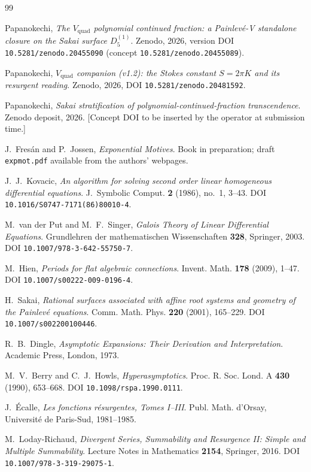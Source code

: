 \documentclass[11pt,reqno]{amsart}
\theoremstyle{plain}
\theoremstyle{definition}
\begin{document}
\begin{thebibliography}{99}

Papanokechi,
\emph{The $V_{\mathrm{quad}}$ polynomial continued fraction: a Painlev\'e-V standalone closure on
the Sakai surface $D_5^{(1)}$}.
Zenodo, 2026, version DOI \texttt{10.5281/zenodo.20455090} (concept
\texttt{10.5281/zenodo.20455089}).

Papanokechi,
\emph{$V_{\mathrm{quad}}$ companion (v1.2): the Stokes constant $S=2\pi K$ and its resurgent
reading}.
Zenodo, 2026, DOI \texttt{10.5281/zenodo.20481592}.

Papanokechi,
\emph{Sakai stratification of polynomial-continued-fraction transcendence}.
Zenodo deposit, 2026. [Concept DOI to be inserted by the operator at submission time.]

J.~Fres\'an and P.~Jossen,
\emph{Exponential Motives}.
Book in preparation; draft \texttt{expmot.pdf} available from the authors' webpages.

J.~J.~Kovacic,
\emph{An algorithm for solving second order linear homogeneous differential equations}.
J.~Symbolic Comput. \textbf{2} (1986), no.~1, 3--43.
DOI \texttt{10.1016/S0747-7171(86)80010-4}.

M.~van der Put and M.~F.~Singer,
\emph{Galois Theory of Linear Differential Equations}.
Grundlehren der mathematischen Wissenschaften \textbf{328}, Springer, 2003.
DOI \texttt{10.1007/978-3-642-55750-7}.

M.~Hien,
\emph{Periods for flat algebraic connections}.
Invent. Math. \textbf{178} (2009), 1--47.
DOI \texttt{10.1007/s00222-009-0196-4}.

H.~Sakai,
\emph{Rational surfaces associated with affine root systems and geometry of the Painlev\'e
equations}.
Comm. Math. Phys. \textbf{220} (2001), 165--229.
DOI \texttt{10.1007/s002200100446}.

R.~B.~Dingle,
\emph{Asymptotic Expansions: Their Derivation and Interpretation}.
Academic Press, London, 1973.

M.~V.~Berry and C.~J.~Howls,
\emph{Hyperasymptotics}.
Proc. R. Soc. Lond. A \textbf{430} (1990), 653--668.
DOI \texttt{10.1098/rspa.1990.0111}.

J.~\'Ecalle,
\emph{Les fonctions r\'esurgentes, Tomes I--III}.
Publ. Math. d'Orsay, Universit\'e de Paris-Sud, 1981--1985.

M.~Loday-Richaud,
\emph{Divergent Series, Summability and Resurgence II: Simple and Multiple Summability}.
Lecture Notes in Mathematics \textbf{2154}, Springer, 2016.
DOI \texttt{10.1007/978-3-319-29075-1}.


\end{thebibliography}
\end{document}
